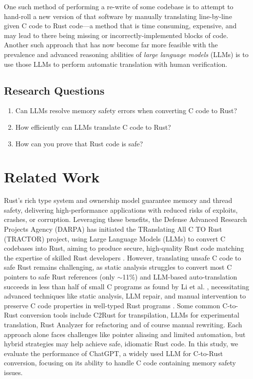 \documentclass[conference]{IEEEtran}
\begin{document}
One such method of performing a re-write of some codebase is to attempt to
hand-roll a new version of that software by manually translating line-by-line
given C code to Rust code---a method that is time consuming, expensive, and
may lead to there being missing or incorrectly-implemented blocks of code.
Another such approach that has now become far more feasible with the
prevalence and advanced reasoning abilities of \textit{large language models}
(LLMs) is to use those LLMs to perform automatic translation with human
verification.

\subsection{Research Questions}
\begin{enumerate}
    \item Can LLMs resolve memory safety errors when converting 
        C code to Rust?
    \item How efficiently can LLMs translate C code to Rust?
    \item How can you prove that Rust code is safe?
\end{enumerate}


\section{Related Work}
Rust's rich type system and ownership model guarantee memory and thread safety, delivering high-performance applications with reduced risks of exploits, crashes, or corruption. Leveraging these benefits, the Defense Advanced Research Projects Agency (DARPA) has initiated the TRanslating All C TO Rust (TRACTOR) project, using Large Language Models (LLMs) to convert C codebases into Rust, aiming to produce secure, high-quality Rust code matching the expertise of skilled Rust developers \cite{darpa_c_to_rust}. However, translating unsafe C code to safe Rust remains challenging, as static analysis struggles to convert most C pointers to safe Rust references (only \(\sim\)11\%) and LLM-based auto-translation succeeds in less than half of small C programs as found by Li et al. \cite{li2024translating}, necessitating advanced techniques like static analysis, LLM repair, and manual intervention to preserve C code properties in well-typed Rust programs \cite{eniser2024towards}. Some common C-to-Rust conversion tools include C2Rust for transpilation, LLMs for experimental translation, Rust Analyzer for refactoring and of course manual rewriting. Each approach alone faces challenges like pointer aliasing and limited automation, but hybrid strategies may help achieve safe, idiomatic Rust code. In this study, we evaluate the performance of ChatGPT, a widely used LLM for C-to-Rust conversion, focusing on its ability to handle C code containing memory safety issues.
\end{document}
